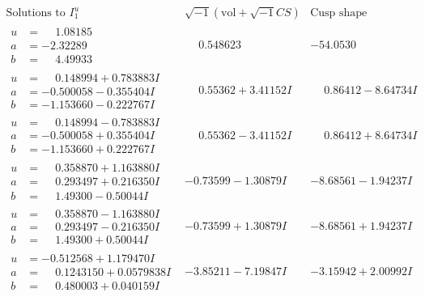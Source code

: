 \documentclass[1p]{elsarticle_modified}
\theoremstyle{definition}
\newcommand{\I}{\sqrt{-1}}
\begin{document}
$$\begin{array}{c|c|c}  
\text{Solutions to }I^u_{1}& \I (\text{vol} + \sqrt{-1}CS) & \text{Cusp shape}\\
 \hline 
\begin{aligned}
u &= \phantom{-}1.08185\phantom{ +0.000000I} \\
a &= -2.32289\phantom{ +0.000000I} \\
b &= \phantom{-}4.49933\phantom{ +0.000000I}\end{aligned}
 & \phantom{-}0.548623\phantom{ +0.000000I} & -54.0530\phantom{ +0.000000I} \\ \hline\begin{aligned}
u &= \phantom{-}0.148994 + 0.783883 I \\
a &= -0.500058 - 0.355404 I \\
b &= -1.153660 - 0.222767 I\end{aligned}
 & \phantom{-}0.55362 + 3.41152 I & \phantom{-}0.86412 - 8.64734 I \\ \hline\begin{aligned}
u &= \phantom{-}0.148994 - 0.783883 I \\
a &= -0.500058 + 0.355404 I \\
b &= -1.153660 + 0.222767 I\end{aligned}
 & \phantom{-}0.55362 - 3.41152 I & \phantom{-}0.86412 + 8.64734 I \\ \hline\begin{aligned}
u &= \phantom{-}0.358870 + 1.163880 I \\
a &= \phantom{-}0.293497 + 0.216350 I \\
b &= \phantom{-}1.49300 - 0.50044 I\end{aligned}
 & -0.73599 - 1.30879 I & -8.68561 - 1.94237 I \\ \hline\begin{aligned}
u &= \phantom{-}0.358870 - 1.163880 I \\
a &= \phantom{-}0.293497 - 0.216350 I \\
b &= \phantom{-}1.49300 + 0.50044 I\end{aligned}
 & -0.73599 + 1.30879 I & -8.68561 + 1.94237 I \\ \hline\begin{aligned}
u &= -0.512568 + 1.179470 I \\
a &= \phantom{-}0.1243150 + 0.0579838 I \\
b &= \phantom{-}0.480003 + 0.040159 I\end{aligned}
 & -3.85211 - 7.19847 I & -3.15942 + 2.00992 I \\ \hline\begin{aligned}

\end{aligned}
\end{array}$$
\end{document}
